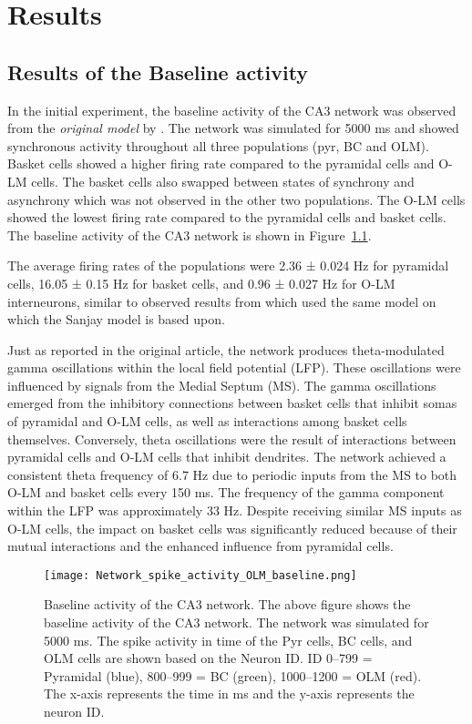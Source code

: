 \chapter{Results}
\section{Results of the Baseline activity}
In the initial experiment, the baseline activity of the CA3 network was
observed from the \textit{original model} by
\textcite{sanjayImpairedDendriticInhibition2015}. The network was simulated for
5000 ms and showed synchronous activity throughout all three
populations (pyr, BC and OLM). Basket cells showed a higher firing rate
compared to the pyramidal cells and O-LM cells. The basket cells also swapped
between states of synchrony and asynchrony which was not observed in the other
two populations. The O-LM cells showed the lowest firing rate compared to the
pyramidal cells and basket cells. The baseline activity of the CA3 network is
shown in Figure~\ref{fig:baseline_activity}.

The average firing rates of the populations were 2.36 ± 0.024 Hz for pyramidal cells,
16.05 ± 0.15 Hz for basket cells, and 0.96 ± 0.027 Hz for O-LM interneurons,
similar to observed results from \textcite{neymotinKetamineDisruptsTheta2011} which used the same model on which the Sanjay model is based upon.

Just as reported in the original article, the network produces theta-modulated gamma oscillations
within the local field potential (LFP). These oscillations were influenced by signals from the Medial Septum (MS).
The gamma oscillations emerged from the inhibitory connections between basket cells that inhibit somas of pyramidal and O-LM cells,
as well as interactions among basket cells themselves. Conversely, theta oscillations were the result of interactions between
pyramidal cells and O-LM cells that inhibit dendrites. The network achieved a consistent theta frequency of 6.7 Hz due to periodic inputs
from the MS to both O-LM and basket cells every 150 ms. The frequency of the gamma component within the LFP was approximately 33 Hz.
Despite receiving similar MS inputs as O-LM cells, the impact on basket cells was significantly reduced because of their mutual interactions
and the enhanced influence from pyramidal cells.

\begin{figure}[htbp]
    \centering
    \texttt{[image: Network\_spike\_activity\_OLM\_baseline.png]}
    \caption[Baseline activity of the CA3 network]{Baseline activity of the CA3 network.
        The above figure shows the baseline activity of the CA3 network. The network was simulated for 5000 ms.
        The spike activity in time of the Pyr cells, BC cells, and OLM cells are shown based on the Neuron ID\@.
        ID 0--799 = Pyramidal (blue), 800--999 = BC (green), 1000--1200 = OLM (red).
        The x-axis represents the time in ms and the y-axis represents the neuron ID\@.}\label{fig:baseline_activity}
\end{figure}
\pagebreak
